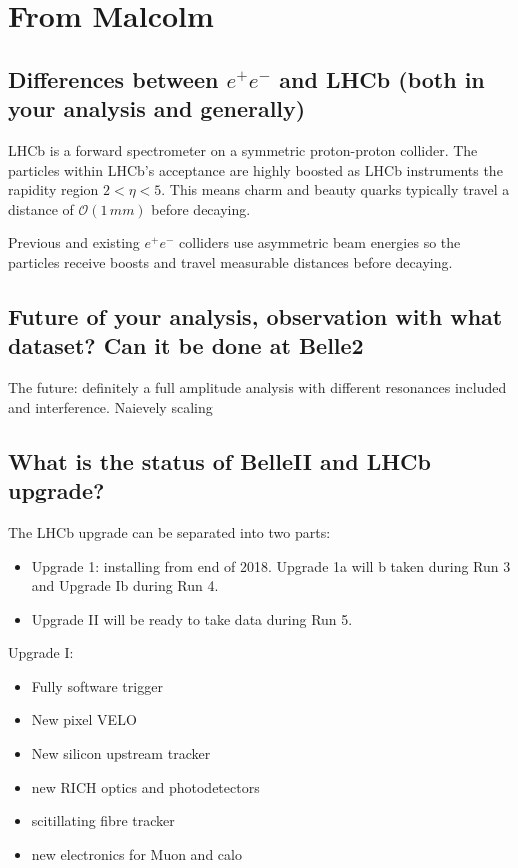 \documentclass[12pt]{article}
\begin{document}
\section{From Malcolm}
\subsection{Differences between $e^{+}e^{-}$ and LHCb (both in your analysis and generally)}

LHCb is a forward spectrometer on a symmetric proton-proton collider. The particles within LHCb's acceptance are highly boosted as LHCb instruments the rapidity region $2<\eta < 5$. This means charm and beauty quarks typically travel a distance of $\mathcal{O}(1\,mm)$ before decaying. 

Previous and existing $e^{+}e^{-}$ colliders use asymmetric beam energies so the particles receive boosts and travel measurable distances before decaying. 


\subsection{Future of your analysis, observation with what dataset? Can it be done at Belle2}

The future: definitely a full amplitude analysis with different resonances included and interference. Naievely scaling 


\subsection{What is the status of BelleII and LHCb upgrade?}


The LHCb upgrade can be separated into two parts:
\begin{itemize}
\item Upgrade 1: installing from end of 2018. Upgrade 1a will b taken during Run 3 and Upgrade Ib during Run 4. 
\item Upgrade II will be ready to take data during Run 5.

\end{itemize}

Upgrade I:
\begin{itemize}
\item Fully software trigger 
\item New pixel VELO
\item New silicon upstream tracker
\item new RICH optics and photodetectors
\item scitillating fibre tracker
\item new electronics for Muon and calo
\end{itemize}
\end{document}
